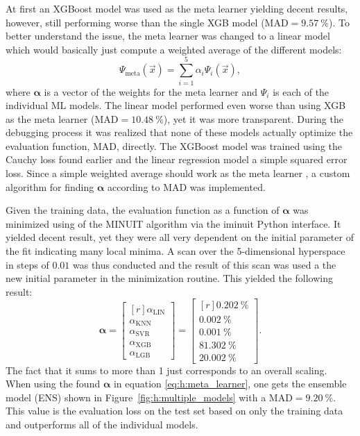 At first an XGBoost model was used as the meta learner yielding decent results, however, still performing worse than the single XGB model ($\mathrm{MAD} = \SI{9.57}{\percent}$). To better understand the issue, the meta learner was changed to a linear model which would basically just compute a weighted average of the different models:
\begin{equation}
  \label{eq:h:meta_learner}
  \Psi_\mathrm{meta}(\vec{x}) = \sum_{i=1}^5 \alpha_i \Psi_i(\vec{x}),
\end{equation}
where $\bm{\alpha}$ is a vector of the weights for the meta learner and $\Psi_i$ is each of the individual ML models. The linear model performed even worse than using XGB as the meta learner ($\mathrm{MAD} = \SI{10.48}{\percent}$), yet it was more transparent. During the debugging process it was realized that none of these models actually optimize the evaluation function, MAD, directly. The XGBoost model was trained using the Cauchy loss found earlier and the linear regression model a simple squared error loss. Since a simple weighted average should work as the meta learner \citep{polleySuperLearnerPrediction2010}, a custom algorithm for finding $\bm{\alpha}$ according to MAD was implemented.

Given the training data, the evaluation function as a function of $\bm{\alpha}$ was minimized using of the MINUIT algorithm \cite{1975CoPhC..10..343J} via the iminuit \cite{iminuit} Python interface. It yielded decent result, yet they were all very dependent on the initial parameter of the fit indicating many local minima. A scan over the 5-dimensional hyperspace in steps of $0.01$ was thus conducted and the result of this scan was used a the new initial parameter in the minimization routine. This yielded the following result:
\begin{equation}
  \bm{\alpha} = \begin{bmatrix*}[r] \alpha_\mathrm{LIN} \\  \alpha_\mathrm{KNN} \\ \alpha_\mathrm{SVR} \\ \alpha_\mathrm{XGB} \\ \alpha_\mathrm{LGB} \end{bmatrix*} = \begin{bmatrix*}[r] \SI{0.202}{\percent} \\  \SI{0.002}{\percent} \\\SI{0.001}{\percent} \\\SI{81.302}{\percent} \\\SI{20.002}{\percent} \end{bmatrix*}.
\end{equation}
The fact that it sums to more than \num{1} just corresponds to an overall scaling. When using the found $\bm{\alpha}$ in equation \eqref{eq:h:meta_learner}, one gets the ensemble model (ENS) shown in Figure~\ref{fig:h:multiple_models} with a $\mathrm{MAD} = \SI{9.20}{\percent}$. This value is the evaluation loss on the test set based on only the training data and outperforms all of the individual models. 

